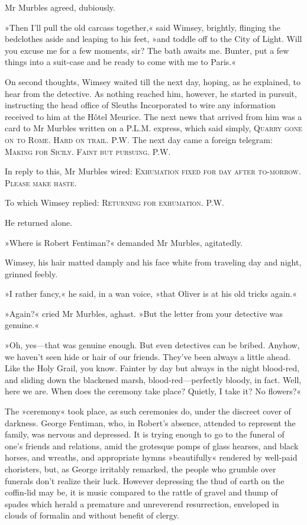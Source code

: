 Mr Murbles agreed, dubiously.

»Then I'll pull the old carcass together,« said Wimsey, brightly, flinging the bedclothes aside and leaping to his feet, »and toddle off to the City of Light. Will you excuse me for a few moments, sir? The bath awaits me. Bunter, put a few things into a suit-case and be ready to come with me to Paris.«

On second thoughts, Wimsey waited till the next day, hoping, as he explained, to hear from the detective. As nothing reached him, however, he started in pursuit, instructing the head office of Sleuths Incorporated to wire any information received to him at the Hôtel Meurice. The next news that arrived from him was a card to Mr Murbles written on a P.L.M. express, which said simply, \textsc{Quarry gone on to Rome. Hard on trail. P.W.} The next day came a foreign telegram: \textsc{Making for Sicily. Faint but pursuing. P.W.}

In reply to this, Mr Murbles wired: \textsc{Exhumation fixed for day after to-morrow. Please make haste.}

To which Wimsey replied: \textsc{Returning for exhumation. P.W.}

He returned alone.

»Where is Robert Fentiman?« demanded Mr Murbles, agitatedly.

Wimsey, his hair matted damply and his face white from traveling day and night, grinned feebly.

»I rather fancy,« he said, in a wan voice, »that Oliver is at his old tricks again.«

»Again?« cried Mr Murbles, aghast. »But the letter from your detective was genuine.«

»Oh, yes—that was genuine enough. But even detectives can be bribed. Anyhow, we haven't seen hide or hair of our friends. They've been always a little ahead. Like the Holy Grail, you know. Fainter by day but always in the night blood-red, and sliding down the blackened marsh, blood-red—perfectly bloody, in fact. Well, here we are. When does the ceremony take place? Quietly, I take it? No flowers?«

The »ceremony« took place, as such ceremonies do, under the discreet cover of darkness. George Fentiman, who, in Robert's absence, attended to represent the family, was nervous and depressed. It is trying enough to go to the funeral of one's friends and relations, amid the grotesque pomps of glass hearses, and black horses, and wreaths, and appropriate hymns »beautifully« rendered by well-paid choristers, but, as George irritably remarked, the people who grumble over funerals don't realize their luck. However depressing the thud of earth on the coffin-lid may be, it is music compared to the rattle of gravel and thump of spades which herald a premature and unreverend resurrection, enveloped in clouds of formalin and without benefit of clergy.

